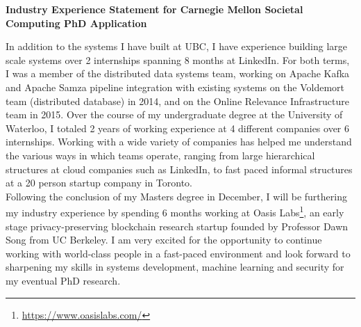 \documentclass[10pt]{article} %
\begin{document}
\begin{center}
{\large \bf Industry Experience Statement for Carnegie Mellon Societal Computing PhD Application}
\end{center}

In addition to the systems I have built at UBC, I have experience building large scale systems over 2 internships spanning 8 months at LinkedIn. For both terms, I was a member of the distributed data systems team, working on Apache Kafka and Apache Samza pipeline integration with existing systems on the Voldemort team (distributed database) in 2014, and on the Online Relevance Infrastructure team in 2015. Over the course of my undergraduate degree at the University of Waterloo, I totaled 2 years of working experience at 4 different companies over 6 internships. Working with a wide variety of companies has helped me understand the various ways in which teams operate, ranging from large hierarchical structures at cloud companies such as LinkedIn, to fast paced informal structures at a 20 person startup company in Toronto.  \\

Following the conclusion of my Masters degree in December, I will be furthering my industry experience by spending 6 months working at Oasis Labs\footnote{\url{https://www.oasislabs.com/}}, an early stage privacy-preserving blockchain research startup founded by Professor Dawn Song from UC Berkeley. I am very excited for the opportunity to continue working with world-class people in a fast-paced environment and look forward to sharpening my skills in systems development, machine learning and security for my eventual PhD research. \\
\end{document}

